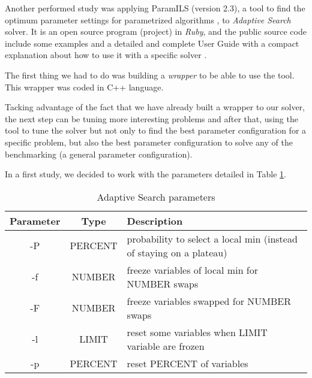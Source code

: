 


Another performed study was applying {\sc ParamILS} (version 2.3), a tool to find the optimum parameter settings for parametrized algorithms \cite{Hutter2009}, to {\it Adaptive Search} solver. It is an open source program (project) in {\it Ruby}, and the public source code include some examples and a detailed and complete User Guide with a compact explanation about how to use it with a specific solver \cite{Hutter2008}. 

The first thing we had to do was building a {\it wrapper} to be able to use the tool. This wrapper was coded in C++ language. 


\nocite{Rickard}

Tacking advantage of the fact that we have already built a wrapper to our solver, the next step can be tuning more interesting problems and after that, using the tool to tune the solver but not only to find the best parameter configuration for a specific problem, but also the best parameter configuration to solve any of the benchmarking (a general parameter configuration).

In a first study, we decided to work with the parameters detailed in Table \ref{table:param}.

\begin{table}[ht] 
\caption{Adaptive Search parameters}
\centering 
\begin{tabular}{c c l}
\hline\hline
Parameter & Type & Description \\ [0.5ex]
\hline
-P & PERCENT & probability to select a local min (instead of staying on a plateau) \\
-f & NUMBER & freeze variables of local min for NUMBER swaps \\ 
-F & NUMBER & freeze variables swapped for NUMBER swaps \\ 
-l & LIMIT & reset some variables when LIMIT variable are frozen \\ 
-p & PERCENT & reset PERCENT of variables \\ [1ex]
\hline
\end{tabular} 
\label{table:param}
\end{table} 

